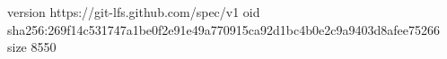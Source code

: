 version https://git-lfs.github.com/spec/v1
oid sha256:269f14c531747a1be0f2e91e49a770915ca92d1bc4b0e2c9a9403d8afee75266
size 8550
